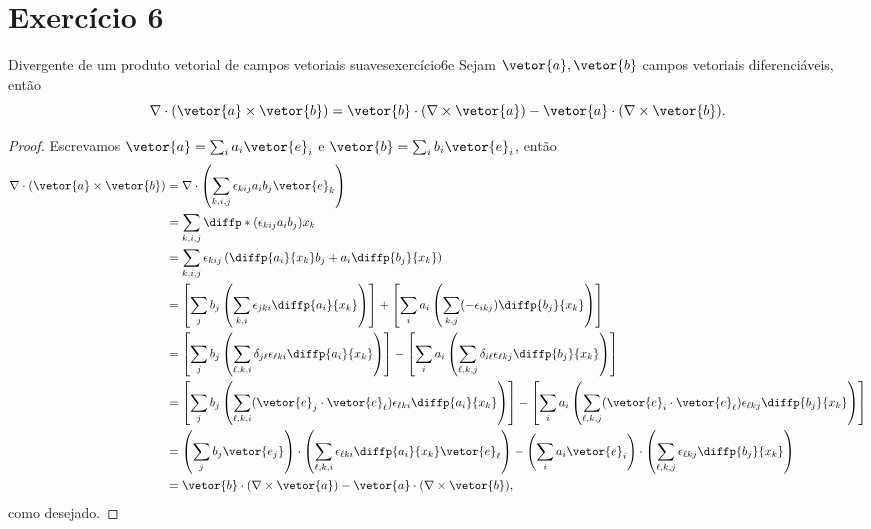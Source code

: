 \section*{Exercício 6}
\begin{proposition}{Divergente de um produto vetorial de campos vetoriais suaves}{exercício6e}
    Sejam \(\vetor{a}, \vetor{b}\) campos vetoriais diferenciáveis, então
    \begin{equation*}
        \nabla \cdot (\vetor{a} \times \vetor{b}) = \vetor{b} \cdot (\nabla \times \vetor{a}) - \vetor{a} \cdot (\nabla \times \vetor{b}).
    \end{equation*}
\end{proposition}
\begin{proof}
    Escrevamos \(\vetor{a} = \sum_{i}a_i \vetor{e}_i\) e \(\vetor{b} = \sum_{i} b_i \vetor{e}_i\), então
    \begin{align*}
        \nabla \cdot (\vetor{a} \times \vetor{b})
        &= \nabla \cdot \left(\sum_{k,i,j} \epsilon_{kij} a_i b_j \vetor{e}_k\right)\\
        &= \sum_{k, i, j} \diffp*{(\epsilon_{kij} a_i b_j)}{x_k}\\
        &= \sum_{k,i,j} \epsilon_{kij} \left(\diffp{a_i}{x_k}b_j + a_i\diffp{b_j}{x_k}\right)\\
        &= \left[\sum_{j} b_j \left(\sum_{k,i} \epsilon_{jki} \diffp{a_i}{x_k}\right)\right] + \left[\sum_{i} a_i\left( \sum_{k,j} (-\epsilon_{ikj}) \diffp{b_j}{x_k}\right)\right]\\
        &= \left[\sum_{j} b_j \left(\sum_{\ell,k,i} \delta_{j\ell}\epsilon_{\ell ki} \diffp{a_i}{x_k}\right)\right] - \left[\sum_{i} a_i\left( \sum_{\ell,k,j} \delta_{i\ell}\epsilon_{\ell kj} \diffp{b_j}{x_k}\right)\right]\\
        &= \left[\sum_{j} b_j \left(\sum_{\ell,k,i} (\vetor{e}_j \cdot \vetor{e}_\ell)\epsilon_{\ell ki} \diffp{a_i}{x_k}\right)\right] - \left[\sum_{i} a_i\left( \sum_{\ell,k,j} (\vetor{e}_i \cdot \vetor{e}_\ell)\epsilon_{\ell kj} \diffp{b_j}{x_k}\right)\right]\\
        &= \left(\sum_{j} b_j \vetor{e_j}\right) \cdot \left(\sum_{\ell, k,i} \epsilon_{\ell ki} \diffp{a_i}{x_k}\vetor{e}_\ell\right) - \left(\sum_{i} a_i\vetor{e}_i\right)\cdot\left(\sum_{\ell,k,j} \epsilon_{\ell kj} \diffp{b_j}{x_k}\right)\\
        &= \vetor{b} \cdot (\nabla \times \vetor{a}) - \vetor{a} \cdot (\nabla \times\vetor{b}),
    \end{align*}
    como desejado.
\end{proof}
